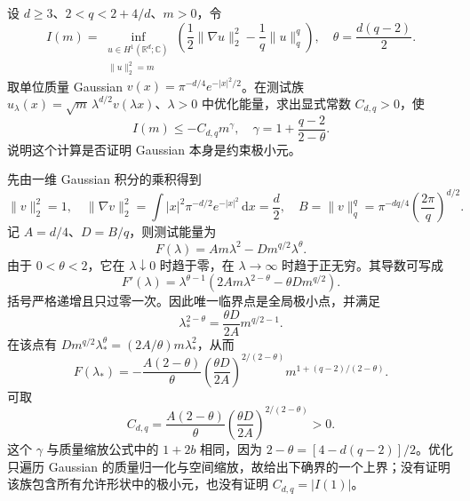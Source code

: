 \begin{exercise}\label{b2:ex:app-F-5}
设 \(d\ge3\)、\(2<q<2+4/d\)、\(m>0\)，令
\[
 I(m)=\inf_{\substack{u\in H^1(\mathbb R^d;\mathbb C)\\\|u\|_2^2=m}}
 \left(\frac12\|\nabla u\|_2^2-\frac1q\|u\|_q^q\right),
 \quad \theta=\frac{d(q-2)}2.
\]
取单位质量 Gaussian \(v(x)=\pi^{-d/4}e^{-|x|^2/2}\)。在测试族
\(u_\lambda(x)=\sqrt m\,\lambda^{d/2}v(\lambda x)\)、\(\lambda>0\)
中优化能量，求出显式常数 \(C_{d,q}>0\)，使
\[
 I(m)\le-C_{d,q}m^\gamma,
 \quad \gamma=1+\frac{q-2}{2-\theta}.
\]
说明这个计算是否证明 Gaussian 本身是约束极小元。
\end{exercise}
\begin{solution}
先由一维 Gaussian 积分的乘积得到
\[
 \|v\|_2^2=1,\quad
 \|\nabla v\|_2^2=\int |x|^2\pi^{-d/2}e^{-|x|^2}\,\mathrm dx=\frac d2,
 \quad B=\|v\|_q^q=\pi^{-dq/4}\left(\frac{2\pi}{q}\right)^{d/2}.
\]
记 \(A=d/4\)、\(D=B/q\)，则测试能量为
\[
 F(\lambda)=Am\lambda^2-Dm^{q/2}\lambda^\theta.
\]
由于 \(0<\theta<2\)，它在 \(\lambda\downarrow0\) 时趋于零，在 \(\lambda\to\infty\) 时趋于正无穷。其导数可写成
\[
 F'(\lambda)=\lambda^{\theta-1}
 \left(2Am\lambda^{2-\theta}-\theta Dm^{q/2}\right).
\]
括号严格递增且只过零一次。因此唯一临界点是全局极小点，并满足
\[
 \lambda_*^{2-\theta}=\frac{\theta D}{2A}m^{q/2-1}.
\]
在该点有 \(Dm^{q/2}\lambda_*^\theta=(2A/\theta)m\lambda_*^2\)，从而
\[
 F(\lambda_*)=-\frac{A(2-\theta)}{\theta}
 \left(\frac{\theta D}{2A}\right)^{2/(2-\theta)}
 m^{1+(q-2)/(2-\theta)}.
\]
可取
\[
 C_{d,q}=\frac{A(2-\theta)}{\theta}
 \left(\frac{\theta D}{2A}\right)^{2/(2-\theta)}>0.
\]
这个 \(\gamma\) 与质量缩放公式中的 \(1+2b\) 相同，因为 \(2-\theta=[4-d(q-2)]/2\)。优化只遍历 Gaussian 的质量归一化与空间缩放，故给出下确界的一个上界；没有证明该族包含所有允许形状中的极小元，也没有证明 \(C_{d,q}=|I(1)|\)。
\end{solution}

